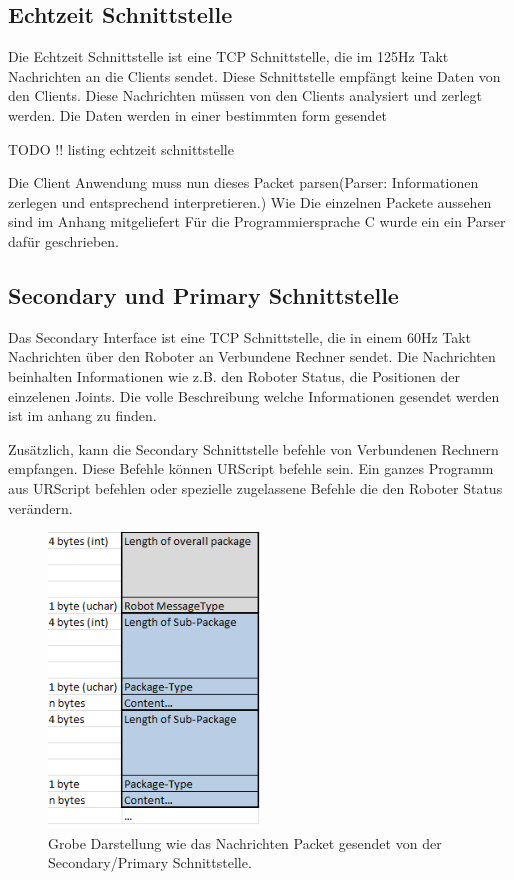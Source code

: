 \subsection{Echtzeit Schnittstelle}
\label{urcontrol_rci_gru}

Die Echtzeit Schnittstelle ist eine TCP Schnittstelle, die im 125Hz Takt Nachrichten an die Clients sendet. Diese Schnittstelle empfängt keine Daten von den Clients. Diese Nachrichten müssen von den Clients analysiert und zerlegt werden. Die Daten werden in einer bestimmten form gesendet

TODO !! listing echtzeit schnittstelle

Die Client Anwendung muss nun dieses Packet parsen(Parser: Informationen zerlegen und entsprechend interpretieren.)
Wie Die einzelnen Packete aussehen sind im Anhang mitgeliefert
Für die Programmiersprache C wurde ein ein Parser dafür geschrieben.

\subsection{Secondary und Primary Schnittstelle}
\label{urcontrol_spi_gru}

Das Secondary Interface ist eine TCP Schnittstelle, die in einem 60Hz Takt Nachrichten über den Roboter an Verbundene Rechner sendet.
Die Nachrichten beinhalten Informationen wie z.B. den Roboter Status, die Positionen der einzelenen Joints.
Die volle Beschreibung welche Informationen gesendet werden ist im anhang zu finden.

Zusätzlich, kann die Secondary Schnittstelle befehle von Verbundenen Rechnern empfangen. 
Diese Befehle können URScript befehle sein. Ein ganzes Programm aus URScript befehlen oder spezielle zugelassene Befehle die den Roboter Status verändern.

\begin{figure}[ht]
  \centering
    \includegraphics[width=0.5\textwidth]{pic/secondary_datapackage_scheme.png}
      \caption[Schema des Datenpackets gesendet von der Secondary Schnittstelle]{Grobe Darstellung wie das Nachrichten Packet gesendet von der Secondary/Primary Schnittstelle.}
      \label{fig:datascheme_of_secondary_interface}
\end{figure}

